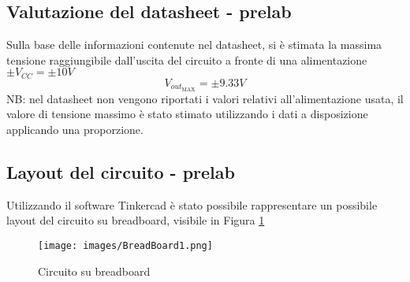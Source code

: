\subsection{Valutazione del datasheet - prelab}
Sulla base delle informazioni contenute nel datasheet, si è stimata la massima tensione raggiungibile dall'uscita del circuito a fronte di una alimentazione $\pm V_{CC}=\pm 10V$ 
\begin{equation*}
    V_{{out}_{\text{MAX}}} = \pm 9.33 V
\end{equation*}
NB: nel datasheet non vengono riportati i valori relativi all'alimentazione usata, il valore di tensione massimo è stato stimato utilizzando i dati a disposizione applicando una proporzione.
\subsection{Layout del circuito - prelab}\label{sec:Pre1}
Utilizzando il software Tinkercad è stato possibile rappresentare un possibile layout del circuito su breadboard, visibile in Figura \ref{fig:BreadBoard1}
\begin{figure}[H]
    \centering
    \texttt{[image: images/BreadBoard1.png]}
    \caption{Circuito su breadboard}
    \label{fig:BreadBoard1}
\end{figure}
